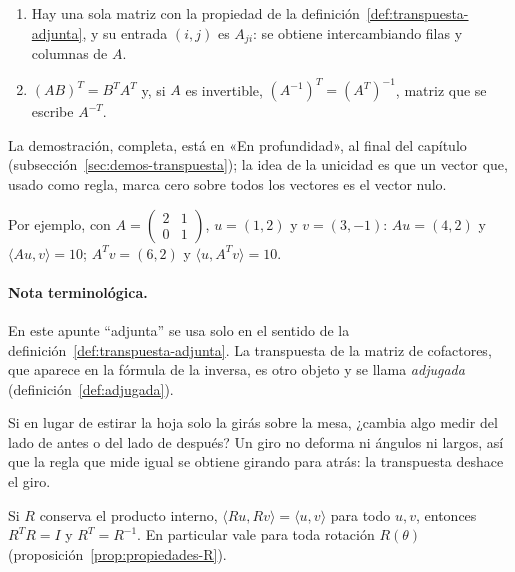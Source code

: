 \begin{proposicion}\label{prop:transpuesta-propiedades}
\begin{enumerate}[label=(\alph*)]
  \item Hay una sola matriz con la propiedad de la definición~\ref{def:transpuesta-adjunta},
  y su entrada \((i,j)\) es \(A_{ji}\): se obtiene intercambiando filas y columnas de \(A\).
  \item \((AB)^T=B^TA^T\) y, si \(A\) es invertible, \((A^{-1})^T=(A^T)^{-1}\), matriz que se
  escribe \(A^{-T}\).
\end{enumerate}
\end{proposicion}

La demostración, completa, está en «En profundidad», al final del capítulo
(subsección~\ref{sec:demos-transpuesta}); la idea de la unicidad es que un vector
que, usado como regla, marca cero sobre todos los vectores es el vector nulo.

Por ejemplo, con \(A=\left(\begin{smallmatrix}2&1\\0&1\end{smallmatrix}\right)\),
\(u=(1,2)\) y \(v=(3,-1)\): \(Au=(4,2)\) y \(\langle Au,v\rangle=10\);
\(A^Tv=(6,2)\) y \(\langle u,A^Tv\rangle=10\).

\paragraph{Nota terminológica.} En este apunte \enquote{adjunta} se usa solo en el sentido de
la definición~\ref{def:transpuesta-adjunta}. La transpuesta de la matriz de cofactores, que
aparece en la fórmula de la inversa, es otro objeto y se llama \emph{adjugada}
(definición~\ref{def:adjugada}).

Si en lugar de estirar la hoja solo la girás sobre la mesa, ¿cambia algo medir del lado de
antes o del lado de después? Un giro no deforma ni ángulos ni largos, así que la regla que
mide igual se obtiene girando para atrás: la transpuesta deshace el giro.

\begin{proposicion}\label{prop:rotacion-transpuesta}
Si \(R\) conserva el producto interno, \(\langle Ru,Rv\rangle=\langle u,v\rangle\) para
todo \(u,v\), entonces \(R^TR=I\) y \(R^T=R^{-1}\). En particular vale para toda rotación
\(R(\theta)\) (proposición~\ref{prop:propiedades-R}).
\end{proposicion}

